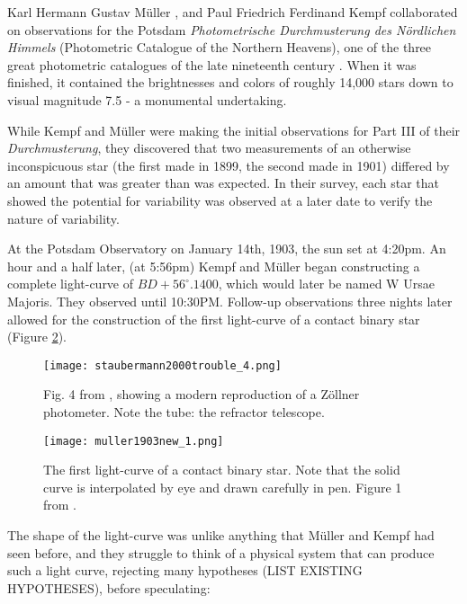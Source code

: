\documentclass[12pt]{article} %
\numberwithin{equation}{section} %
\begin{document}
Karl Hermann Gustav M\"uller , and Paul Friedrich Ferdinand Kempf  collaborated on observations for the Potsdam \emph{Photometrische Durchmusterung des N\"ordlichen Himmels} (Photometric Catalogue of the Northern Heavens), one of the three great photometric catalogues of the late nineteenth century \citep{bolt2007biographical}. When it was finished, it contained the brightnesses and colors of roughly 14,000 stars down to visual magnitude 7.5 - a monumental undertaking.

While Kempf and M\"uller were making the initial observations for Part III of their \emph{Durchmusterung}, they discovered that two measurements of an otherwise inconspicuous star (the first made in 1899, the second made in 1901) differed by an amount that was greater than was expected. In their survey, each star that showed the potential for variability was observed at a later date to verify the nature of variability.

At the Potsdam Observatory on January 14th, 1903, the sun set at 4:20pm. An hour and a half later, (at 5:56pm) Kempf and M\"uller began constructing a complete light-curve of $BD +56^{\circ}.1400$, which would later be named W Ursae Majoris. They observed until 10:30PM. Follow-up observations three nights later allowed for the construction of the first light-curve of a contact binary star (Figure \ref{fig: muller1903new_1}).

\begin{figure}[H]
\centering
\texttt{[image: staubermann2000trouble\_4.png]}
\caption{Fig. 4 from \citet{staubermann2000trouble}, showing a modern reproduction of a Z\"ollner photometer. Note the tube: the refractor telescope.}
\label{fig: staubermann2000trouble_4}
\end{figure}

\begin{figure}[H]
\centering
\texttt{[image: muller1903new\_1.png]}
\caption{The first light-curve of a contact binary star. Note that the solid curve is interpolated by eye and drawn carefully in pen. Figure 1 from \citet{muller1903new}.}
\label{fig: muller1903new_1}
\end{figure}

The shape of the light-curve was unlike anything that M\"uller and Kempf had seen before, and they struggle to think of a physical system that can produce such a light curve, rejecting many hypotheses (LIST EXISTING HYPOTHESES), before speculating: \\
\end{document}
